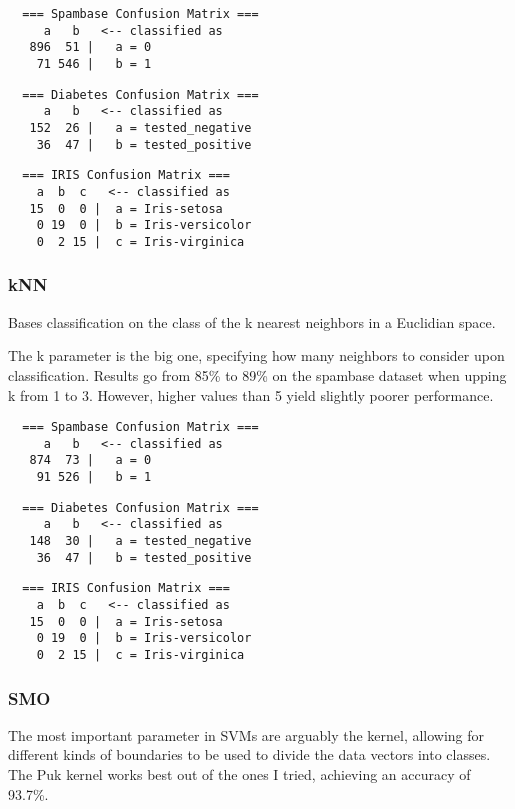 \documentclass[11pt,a4paper]{article}
\begin{document}
\begin{verbatim}
  === Spambase Confusion Matrix ===
     a   b   <-- classified as
   896  51 |   a = 0
    71 546 |   b = 1
\end{verbatim}

\begin{verbatim}
  === Diabetes Confusion Matrix ===
     a   b   <-- classified as
   152  26 |   a = tested_negative
    36  47 |   b = tested_positive
\end{verbatim}

\begin{verbatim}
  === IRIS Confusion Matrix ===
    a  b  c   <-- classified as
   15  0  0 |  a = Iris-setosa
    0 19  0 |  b = Iris-versicolor
    0  2 15 |  c = Iris-virginica
\end{verbatim}

\subsubsection*{kNN}

Bases classification on the class of the k nearest neighbors in a Euclidian space.

The k parameter is the big one, specifying how many neighbors to consider upon classification. Results go from 85\% to 89\% on the spambase dataset when upping k from 1 to 3. However, higher values than 5 yield slightly poorer performance.

\begin{verbatim}
  === Spambase Confusion Matrix ===
     a   b   <-- classified as
   874  73 |   a = 0
    91 526 |   b = 1
\end{verbatim}

\begin{verbatim}
  === Diabetes Confusion Matrix ===
     a   b   <-- classified as
   148  30 |   a = tested_negative
    36  47 |   b = tested_positive
\end{verbatim}

\begin{verbatim}
  === IRIS Confusion Matrix ===
    a  b  c   <-- classified as
   15  0  0 |  a = Iris-setosa
    0 19  0 |  b = Iris-versicolor
    0  2 15 |  c = Iris-virginica
\end{verbatim}

\subsubsection*{SMO}

The most important parameter in SVMs are arguably the kernel, allowing for different kinds of boundaries to be used to divide the data vectors into classes. The Puk kernel works best out of the ones I tried, achieving an accuracy of 93.7\%.
\end{document}
